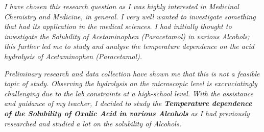 \textit{I have chosen this research question as I was highly interested in Medicinal Chemistry and Medicine, in general. I very well wanted to investigate something that had its application in the medical sciences. I had initially thought to investigate the Solubility of Acetaminophen (Paracetamol) in various Alcohols; this further led me to study and analyse the temperature dependence on the acid hydrolysis of Acetaminophen (Paracetamol).}

\textit{Preliminary research and data collection have shown me that this is not a feasible topic of study. Observing the hydrolysis on the microscopic level is excruciatingly challenging due to the lab constraints at a high-school level. With the assistance and guidance of my teacher, I decided to study the \textbf{Temperature dependence of the Solubility of Oxalic Acid in various Alcohols} as I had previously researched and studied a lot on the solubility of Alcohols.}

